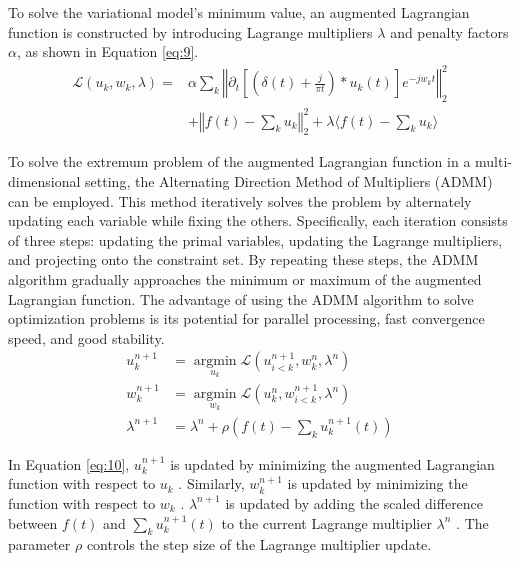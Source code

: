 \documentclass[3p,authoryear,preprint,12pt]{elsarticle}
\begin{document}
To solve the variational model's minimum value, an augmented Lagrangian function is constructed by introducing Lagrange multipliers $\lambda$ and penalty factors $\alpha$, as shown in Equation \ref{eq:9}.
\begin{equation}
	\label{eq:9}
	\begin{aligned}
		\mathscr{L}(u_k,w_k,\lambda) = &\alpha \sum_k \left\Vert \partial_t \left[\left(\delta(t) + \frac{j}{\pi t}\right) \ast u_k(t) \right] e^{-jw_kt} \right\Vert_2^2 \\
		&+ \left\Vert f(t) - \sum_k u_k \right\Vert_2^2 + \lambda \langle  f(t) - \sum_k u_k  \rangle
	\end{aligned}
\end{equation}

To solve the extremum problem of the augmented Lagrangian function in a multi-dimensional setting, the Alternating Direction Method of Multipliers (ADMM) \citep{BoydDistributedOptimizationStatistical2011} can be employed. This method iteratively solves the problem by alternately updating each variable while fixing the others. Specifically, each iteration consists of three steps: updating the primal variables, updating the Lagrange multipliers, and projecting onto the constraint set. By repeating these steps, the ADMM algorithm gradually approaches the minimum or maximum of the augmented Lagrangian function. The advantage of using the ADMM algorithm to solve optimization problems is its potential for parallel processing, fast convergence speed, and good stability.
\begin{equation}
	\label{eq:10}
	\begin{aligned}
		u_k^{n+1} &= \operatorname*{argmin}_{{u_k}} \mathscr{L}\left( u_{i<k}^{n+1},w_k^n,\lambda^n \right) \\
		w_k^{n+1} &= \operatorname*{argmin}_{{w_k}} \mathscr{L}\left( u_{ k}^{n },w_{i<k}^{n+1},\lambda^n \right)\\
		\lambda^{n+1} &= \lambda^n + \rho \left( f(t) - \sum_k u_k^{n+1}(t) \right)
	\end{aligned}
\end{equation}

In Equation \ref{eq:10}, $u_k^{n+1}$  is updated by minimizing the augmented Lagrangian function with respect to  $u_k$ . Similarly, $w_k^{n+1}$  is updated by minimizing the function with respect to $w_k$ . $\lambda^{n+1}$  is updated by adding the scaled difference between $f(t)$  and $\sum_k u_k^{n+1}(t)$  to the current Lagrange multiplier $ \lambda^n $  . The parameter $\rho$  controls the step size of the Lagrange multiplier update.
\end{document}
